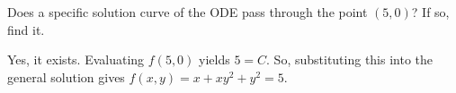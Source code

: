 Does a specific solution curve of the ODE pass through the point $(5,0)$? If so, find it.

\nnl Yes, it exists. Evaluating $f(5,0)$ yields $5 = C$. So, substituting this into the general solution gives $f(x,y) = x + xy^2 + y^2 = 5$.